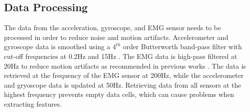\subsection{Data Processing}
\label{sec:Approach:Data-Processing}
The data from the acceleration, gyroscope, and EMG sensor needs to be processed in order to reduce noise and motion artifacts. Accelerometer and gyroscope data is smoothed using a $4^{th}$ order Butterworth band-pass filter with cut-off frequencies at 0.2Hz and 15Hz \cite{1419604}. The EMG data is high-pass filtered at 20Hz to reduce motion artifacts as recommended in previous works \cite{DeLuca2010}. The data is retrieved at the frequency of the EMG sensor at 200Hz, while the accelerometer and gryoscope data is updated at 50Hz. Retrieving data from all sensors at the highest frequency prevents empty data cells, which can cause problems when extracting features.

